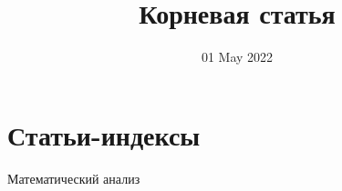 
\title{Корневая статья}
\author{}
\date{01 May 2022}

\maketitle
\section{Статьи-индексы}
\begin{description}
    \item[Математический анализ] 
\end{description}
